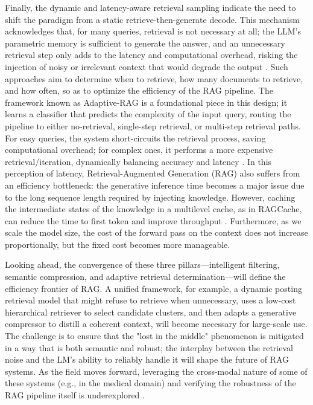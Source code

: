 \documentclass[11pt,a4paper]{article}
\begin{document}
Finally, the dynamic and latency-aware retrieval sampling indicate the need to shift the paradigm from a static retrieve-then-generate decode. This mechanism acknowledges that, for many queries, retrieval is not necessary at all; the LLM's parametric memory is sufficient to generate the answer, and an unnecessary retrieval step only adds to the latency and computational overhead, risking the injection of noisy or irrelevant context that would degrade the output \cite{arxiv:2403.14403v2}. Such approaches aim to determine when to retrieve, how many documents to retrieve, and how often, so as to optimize the efficiency of the RAG pipeline. The framework known as Adaptive-RAG is a foundational piece in this design; it learns a classifier that predicts the complexity of the input query, routing the pipeline to either no-retrieval, single-step retrieval, or multi-step retrieval paths. For easy queries, the system short-circuits the retrieval process, saving computational overhead; for complex ones, it performs a more expensive retrieval/iteration, dynamically balancing accuracy and latency \cite{arxiv:2403.14403v2}. In this perception of latency, Retrieval-Augmented Generation (RAG) also suffers from an efficiency bottleneck: the generative inference time becomes a major issue due to the long sequence length required by injecting knowledge. However, caching the intermediate states of the knowledge in a multilevel cache, as in RAGCache, can reduce the time to first token and improve throughput \cite{arxiv:2404.12457v2}. Furthermore, as we scale the model size, the cost of the forward pass on the context does not increase proportionally, but the fixed cost becomes more manageable.

Looking ahead, the convergence of these three pillars---intelligent filtering, semantic compression, and adaptive retrieval determination---will define the efficiency frontier of RAG. A unified framework, for example, a dynamic posting retrieval model that might refuse to retrieve when unnecessary, uses a low-cost hierarchical retriever to select candidate clusters, and then adapts a generative compressor to distill a coherent context, will become necessary for large-scale use. The challenge is to ensure that the "lost in the middle" phenomenon is mitigated in a way that is both semantic and robust; the interplay between the retrieval noise and the LM's ability to reliably handle it will shape the future of RAG systems. As the field moves forward, leveraging the cross-modal nature of some of these systems (e.g., in the medical domain) and verifying the robustness of the RAG pipeline itself is underexplored \cite{arxiv:2402.13178v2,arxiv:2404.13948v1}.
\end{document}
